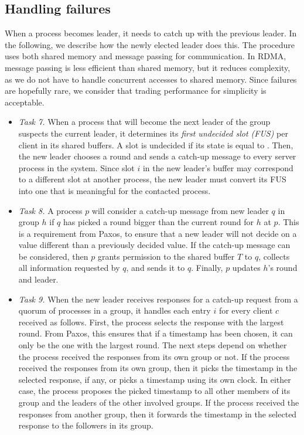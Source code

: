 
% 

\subsection{Handling failures}
\label{sec:failurecase}

%

When a process becomes leader, it needs to catch up with the previous leader.
In the following, we describe how the newly elected leader does this.
The procedure uses both shared memory and message passing for communication.
In RDMA, message passing is less efficient than shared memory, but it reduces complexity, as we do not have to handle concurrent accesses to shared memory.
Since failures are hopefully rare, we consider that trading performance for simplicity is acceptable.

\begin{itemize}
\item \emph{Task 7.} 
When a process that will become the next leader of the group suspects the current leader, it determines its \emph{first undecided slot (FUS)} per client in its shared buffers.
A slot is undecided if its state is equal to \mcast. 
Then, the new leader chooses a round and sends a catch-up message to every server process in the system.
Since slot $i$ in the new leader's buffer may correspond to a different slot at another process, the new leader must convert its FUS into one that is meaningful for the contacted process.

\item \emph{Task 8.} 
A process $p$ will consider a catch-up message from new leader $q$ in group $h$ if $q$ has picked a round bigger than the current round for $h$ at $p$.
This is a requirement from Paxos, to ensure that a new leader will not decide on a value different than a previously decided value.
If the catch-up message can be considered, then $p$ grants permission to the shared buffer $T$ to $q$, collects all information requested by $q$, and sends it to $q$.
Finally, $p$ updates $h$'s round and leader.

\item \emph{Task 9.}
When the new leader receives responses for a catch-up request from a quorum of processes in a group, it handles each entry $i$ for every client $c$ received as follows.
First, the process selects the response with the largest round. 
From Paxos, this ensures that if a timestamp has been chosen, it can only be the one with the largest round.
The next steps depend on whether the process received the responses from its own group or not.
If the process received the responses from its own group, then it picks the timestamp in the selected response, if any, or picks a timestamp using its own clock. 
In either case, the process proposes the picked timestamp to all other members of its group and the leaders of the other involved groups.
If the process received the responses from another group, then it forwards the timestamp in the selected response to the followers in its group.
\end{itemize}

